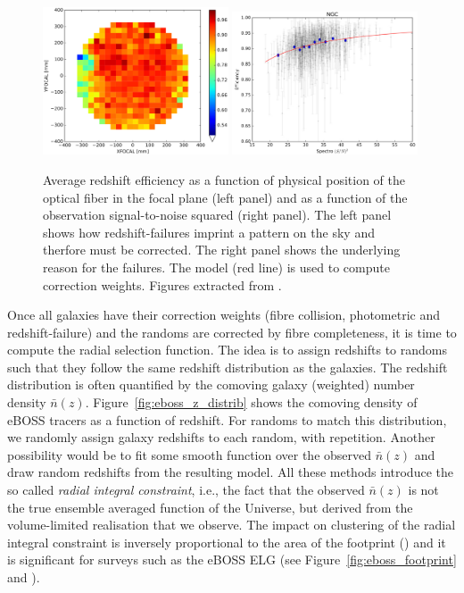 \begin{figure}
    \centering 
    \includegraphics[width=0.49\textwidth]{fig/galaxies/eboss_z_failures_focalplane.png}
    \includegraphics[width=0.49\textwidth]{fig/galaxies/eboss_z_failures_sn.png}
    \caption{ 
        Average redshift efficiency as a function of physical position of the optical 
        fiber in the focal plane (left panel) and as a function of the observation
        signal-to-noise squared (right panel).  
        The left panel shows how redshift-failures imprint a pattern on the sky 
        and therfore must be corrected. The right panel shows the underlying reason 
        for the failures. The model (red line) is used to compute correction weights.
    Figures extracted from \cite{bautistaSDSSIVExtendedBaryon2018}.} 
    \label{fig:eboss_zfailures}
\end{figure}

Once all galaxies have their correction weights (fibre collision, photometric and 
redshift-failure) and the randoms are corrected by fibre completeness, 
it is time to compute the radial selection function. 
The idea is to assign redshifts to randoms 
such that they follow the same redshift distribution as the galaxies. 
The redshift distribution is often quantified by the comoving galaxy (weighted)
number density $\bar{n}(z)$. 
Figure~\ref{fig:eboss_z_distrib} shows the comoving density of eBOSS tracers 
as a function of redshift. 
For randoms to match this distribution, we randomly assign galaxy 
redshifts to each random, with repetition. Another possibility would be to 
fit some smooth function over the observed $\bar{n}(z)$ and draw random redshifts
from the resulting model. All these methods introduce the so called 
\emph{radial integral constraint}, i.e., the fact that the observed $\bar{n}(z)$ is 
not the true ensemble averaged function of the Universe, but derived from the 
volume-limited realisation that we observe. 
The impact on clustering of the radial integral constraint is 
inversely proportional to the area of the footprint
(\cite{demattiaIntegralConstraintsSpectroscopic2019}) and it is significant 
for surveys such as the eBOSS ELG (see Figure~\ref{fig:eboss_footprint} and 
\cite{tamoneCompletedSDSSIVExtended2020, demattiaCompletedSDSSIVExtended2021}). 


